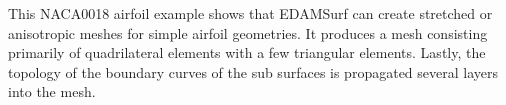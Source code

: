 This NACA0018 airfoil example shows that EDAMSurf can create stretched or anisotropic meshes for simple airfoil geometries. It produces a mesh consisting primarily of quadrilateral elements with a few triangular elements. Lastly, the topology of the boundary curves of the sub surfaces is propagated several layers into the mesh.

